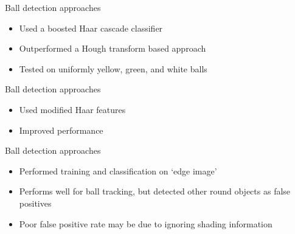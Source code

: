\begin{frame}{Ball detection approaches}
		\citet{masselli2013haar}
			\begin{itemize}
				\item Used a boosted Haar cascade classifier
				\item Outperformed a Hough transform based approach
				\item Tested on uniformly yellow, green, and white balls
			\end{itemize}
\end{frame}

\begin{frame}{Ball detection approaches}
	\citet{zhang2013novel}
	\begin{itemize}
		\item Used modified Haar features
		\item Improved performance
	\end{itemize}
\end{frame}

\begin{frame}{Ball detection approaches}
	\citet{mitri2004fast}
	\begin{itemize}
		\item Performed training and classification on `edge image'
		\item Performs well for ball tracking, but detected other round objects as false positives
		\item Poor false positive rate may be due to ignoring shading information%
\end{itemize}
\end{frame}

